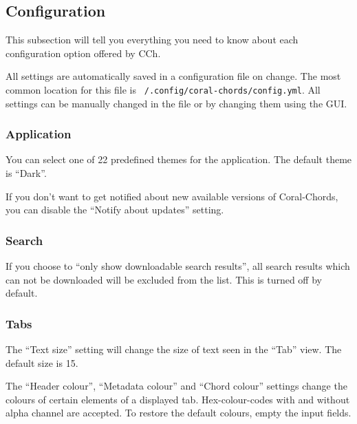 \documentclass[12pt, a4paper]{article}
\begin{document}
                \subsection{Configuration}
                        
                                This subsection will tell you everything you need to know about each configuration option offered by CCh.

                                All settings are automatically saved in a configuration file on change. The most common location for this file is \texttt{~/.config/coral-chords/config.yml}. All settings can be manually changed in the file or by changing them using the GUI.\@
                        {
                                \raggedright
                                \subsubsection{Application}
                                You can select one of 22 predefined themes for the application. The default theme is ``Dark''.\break

                                If you don't want to get notified about new available versions of Coral-Chords, you can disable the ``Notify about updates'' setting.\break 
                                 
                                \subsubsection{Search}
                                If you choose to ``only show downloadable search results'', all search results which can not be downloaded will be excluded from the list. This is turned off by default.\break
 
                                \subsubsection{Tabs}
                                The ``Text size'' setting will change the size of text seen in the ``Tab'' view. The default size is 15.\break

                                The ``Header colour'', ``Metadata colour'' and ``Chord colour'' settings change the colours of certain elements of a displayed tab. Hex-colour-codes with and without alpha channel are accepted. To restore the default colours, empty the input fields.


}
\end{document}
